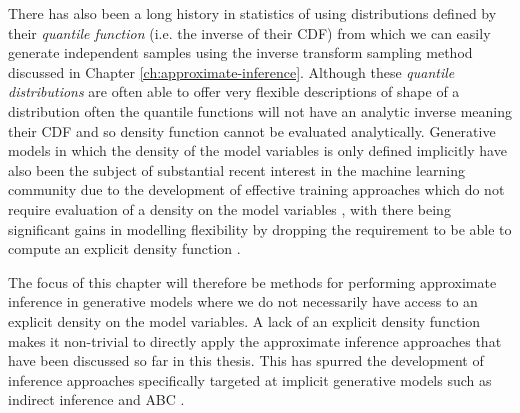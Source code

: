 There has also been a long history in statistics of using distributions defined by their \emph{quantile function} (i.e. the inverse of their \ac{CDF}) \citep{hastings1947low,tukey1960practical} from which we can easily generate independent samples using the inverse transform sampling method discussed in Chapter \ref{ch:approximate-inference}. Although these \emph{quantile distributions} are often able to offer very flexible descriptions of shape of a distribution \citep{gilchrist2000statistical} 
often the quantile functions will not have an analytic inverse meaning their \ac{CDF} and so density function cannot be evaluated analytically. Generative models in which the density of the model variables is only defined implicitly have also been the subject of substantial recent interest in the machine learning community due to the development of effective training approaches which do not require evaluation of a density on the model variables \citep{li2015generative,dziugaite2015training,goodfellow2014generative}, with there being significant gains in modelling flexibility by dropping the requirement to be able to compute an explicit density function \citep{mohamed2016learning,tran2017deep}.


The focus of this chapter will therefore be methods for performing approximate inference in generative models where we do not necessarily have access to an explicit density on the model variables. 
A lack of an explicit density function makes it non-trivial to directly apply the approximate inference approaches that have been discussed so far in this thesis. This has spurred the development of inference approaches specifically targeted at implicit generative models such as indirect inference \citep{gourieroux1993indirect} and \ac{ABC} \citep{beaumont2002approximate}.%
 
